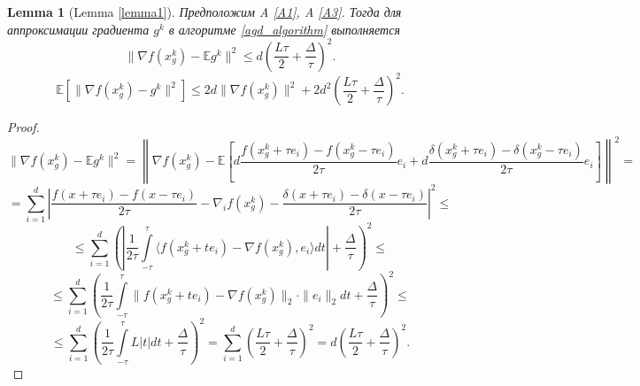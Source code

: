 \documentclass{article}
\newtheorem{lemma}{Lemma}
\begin{document}
\newpage
\appendix
\begin{lemma}[Lemma \ref{lemma1}]\label{lemma1_appendix}
 Предположим A \ref{A1}, A \ref{A3}. Тогда для аппроксимации градиента $g^k$ в алгоритме \ref{agd_algorithm} выполняется
 \begin{equation}
  \|\nabla f(x_g^k) - \mathbb{E}g^k\|^2 \leqslant d \left(\frac{L\tau}{2} + \frac{\Delta}{\tau}\right)^2.
  \label{norm_of_expectation_appendix}
 \end{equation}
 \begin{equation}
  \mathbb{E}[\|\nabla f(x_g^k) - g^k\|^2] \leqslant 2d \|\nabla f(x_g^k)\|^2 + 2 d^2 \left(\frac{L\tau}{2} + \frac{\Delta}{\tau}\right)^2.
  \label{expectation_of_norm_appendix}
 \end{equation}
\end{lemma}
\begin{proof}
  $$\|\nabla f(x_g^k) - \mathbb{E} g^k\|^2 = \left\lVert \nabla f(x_g^k) - \mathbb{E}\left[d\frac{f(x_g^k + \tau e_i) - f(x_g^k - \tau e_i)}{2\tau} e_i + d\frac{\delta(x_g^k + \tau e_i) - \delta(x_g^k - \tau e_i)}{2\tau} e_i\right]\right\rVert^2 = $$
  $$=\sum\limits_{i = 1}^d \left|\frac{f(x + \tau e_i) - f(x - \tau e_i)}{2\tau} - \nabla_i f(x_g^k) - \frac{\delta(x + \tau e_i) - \delta(x - \tau e_i)}{2\tau}\right|^2 \leqslant$$
  $$\leqslant \sum\limits_{i = 1}^d\left( \left|\frac{1}{2\tau} \int\limits_{-\tau}^\tau \langle f(x_g^k + t e_i) - \nabla f(x_g^k), e_i \rangle dt\right| + \frac{\Delta}{\tau}\right)^2 \leqslant$$
  $$\leqslant \sum\limits_{i = 1}^d\left( \frac{1}{2\tau} \int\limits_{-\tau}^\tau \|f(x_g^k + t e_i) - \nabla f(x_g^k)\|_2 \cdot \|e_i\|_2 dt + \frac{\Delta}{\tau}\right)^2 \leqslant$$
  $$\leqslant \sum\limits_{i = 1}^d\left( \frac{1}{2\tau} \int\limits_{-\tau}^\tau L |t| dt + \frac{\Delta}{\tau}\right)^2 = \sum\limits_{i = 1}^d\left( \frac{L\tau}{2} + \frac{\Delta}{\tau} \right)^2 = d \left(\frac{L\tau}{2} + \frac{\Delta}{\tau}\right)^2.$$


\end{proof}
\end{document}
